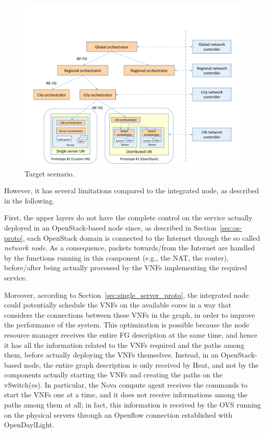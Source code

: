 {\begin{figure}%
	\centering
	\includegraphics[clip= true, width= 1\columnwidth, trim= 0in 0in 0.0in 0in, page = 40]{images/Pictures_definitivo.pdf}
	\caption{Target scenario.}
	\label{fig:target_scenario}
\end{figure}


However, it has several limitations compared to the integrated node, as described in the following.

First, the upper layers do not have the complete control on the service actually deployed in an OpenStack-based node since, as described in Section~\ref{sec:os-proto}, each OpenStack domain is connected to the Internet through the so called \textit{network node}.
As a consequence, packets towards/from the Internet are handled by the functions running in this component (e.g., the NAT, the router), before/after being actually processed by the VNFs implementing the required service.

Moreover, according to Section~\ref{sec:single_server_proto}, the integrated node could potentially schedule the VNFs on the available cores in a way that considers the connections between these VNFs in the graph, in order to improve the performance of the system. 
This optimization is possible because the node resource manager receives the entire FG description at the same time, and hence it has all the information related to the VNFs required and the paths among them, before actually deploying the VNFs themselves.
Instead, in an OpenStack-based node, the entire graph description is only received by Heat, and not by the components actually starting the VNFs and creating the paths on the vSwitch(es).
In particular, the Nova compute agent receives the commands to start the VNFs one at a time, and it does not receive informations among the paths among them at all; in fact, this information is received by the OVS running on the physical servers through an Openflow connection established with OpenDaylLight.

}
